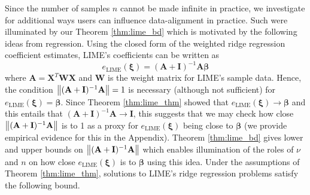 \documentclass[mnsc,blindrev]{informs3}
\begin{document}
             
            Since the number of samples $n$ cannot be made infinite in practice, we investigate for additional ways users can influence data-alignment in practice. Such were illuminated by our Theorem \ref{thm:lime_bd} which is motivated by the following ideas from regression. Using the closed form of the weighted ridge regression coefficient estimates, LIME's coefficients can be written as
            \begin{equation*}
                e_{\text{LIME}}(\boldsymbol{\xi})=(\mathbf{A} + \mathbf{I})^{-1}\mathbf{A} \boldsymbol{\beta}
            \end{equation*}
            where $\mathbf{A} = \mathbf{X}^T \mathbf{W}\mathbf{X}$ and $\mathbf{W}$ is the weight matrix for LIME's sample data.  Hence, the condition $\norm{(\mathbf{A} + \mathbf{I})^{-1}\mathbf{A}}=1$ is necessary (although not sufficient) for $e_{\text{LIME}}(\boldsymbol{\xi}) = \boldsymbol{\beta}$. Since Theorem \ref{thm:lime_thm} showed that $e_{\text{LIME}}(\boldsymbol{\xi})\rightarrow \boldsymbol{\beta}$ and this entails that $(\mathbf{A} + \mathbf{I})^{-1}\mathbf{A}\rightarrow \mathbf{I}$, this suggests that we may check how close $\norm{(\mathbf{A} + \mathbf{I})^{-1}\mathbf{A}}$ is to 1 as a proxy for $e_{\text{LIME}}(\boldsymbol{\xi})$ being close to $\boldsymbol{\beta}$ (we provide empirical evidence for this in the Appendix). Theorem \ref{thm:lime_bd} gives lower and upper bounds on $\norm{(\mathbf{A} + \mathbf{I})^{-1}\mathbf{A}}$ which enables illumination of the roles of $\nu$ and $n$ on how close $e_{\text{LIME}}(\boldsymbol{\xi})$ is to $\boldsymbol{\beta}$ using this idea.  Under the assumptions of Theorem \ref{thm:lime_thm}, solutions to LIME's ridge regression problems satisfy the following bound.
            
\end{document}
